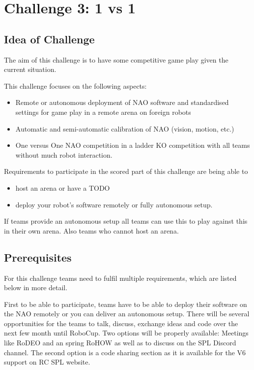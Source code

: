 \section{Challenge 3: 1 vs 1}

\subsection{Idea of Challenge}
The aim of this challenge is to have some competitive game play given the current situation.   

This challenge focuses on the following aspects:
\begin{itemize}
    \item Remote or autonomous deployment of NAO software and standardised settings for game play in a remote arena on foreign robots
    \item Automatic and semi-automatic calibration of NAO (vision, motion, etc.) 
    \item One versus One NAO competition in a ladder KO competition with all teams without much robot interaction. 
\end{itemize}

Requirements to participate in the scored part of this challenge are being able to
\begin{itemize}
    \item host an arena or have a TODO
    \item deploy your robot's software remotely or fully autonomous setup. 
\end{itemize}

If teams provide an autonomous setup all teams can use this to play against this in their own arena. Also teams who cannot host an arena.

\subsection{Prerequisites}
For this challenge teams need to fulfil multiple requirements, which are listed below in more detail.

First to be able to participate, teams have to be able to deploy their software on the NAO remotely or you can deliver an autonomous setup. There will be several opportunities for the teams to talk, discuss, exchange ideas and code over the next few month until RoboCup. Two options will be properly available: Meetings like RoDEO and an spring RoHOW as well as to discuss on the SPL Discord channel. The second option is a code sharing section as it is available for the V6 support on RC SPL website.  

